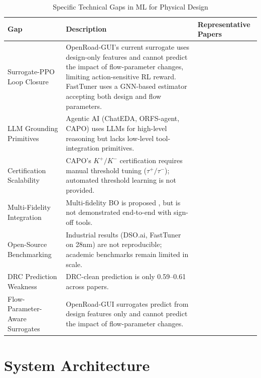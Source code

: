 \documentclass[10pt,conference]{IEEEtran}
\newcommand{\AUC}{\text{AUC}}
\begin{document}
\begin{table}[t]
\centering
\caption{Specific Technical Gaps in ML for Physical Design}
\label{tab:gaps}
\small
\setlength{\tabcolsep}{2.5pt}
\renewcommand{\arraystretch}{1.12}
\begin{tabularx}{\columnwidth}{@{}>{\raggedright\arraybackslash}p{}X>{\raggedright\arraybackslash}p{}@{}}
\toprule
Gap & Description & Representative Papers \\
\midrule
Surrogate-PPO Loop Closure & OpenRoad-GUI's current surrogate uses design-only features and cannot predict the impact of flow-parameter changes, limiting action-sensitive RL reward. FastTuner \cite{hsiao2026fasttuner} uses a GNN-based estimator accepting both design and flow parameters. & \cite{hsiao2026fasttuner, this work} \\
LLM Grounding Primitives & Agentic AI (ChatEDA, ORFS-agent, CAPO) uses LLMs for high-level reasoning but lacks low-level tool-integration primitives. & \cite{ghose2026agentic,jiang2026capo} \\
Certification Scalability & CAPO's $K^+/K^-$ certification requires manual threshold tuning ($\tau^+/\tau^-$); automated threshold learning is not provided. & \cite{jiang2026capo} \\
Multi-Fidelity Integration & Multi-fidelity BO is proposed \cite{chen2025graph,shrirao2024intelligent}, but is not demonstrated end-to-end with sign-off tools. & \cite{chen2025graph,shrirao2024intelligent} \\
Open-Source Benchmarking & Industrial results (DSO.ai, FastTuner on 28nm) are not reproducible; academic benchmarks remain limited in scale. & \cite{verma2024dso,hsiao2026fasttuner} \\
DRC Prediction Weakness & DRC-clean prediction \AUC{} is only 0.59--0.61 across papers. & \cite{mutar2026auto, this work} \\
Flow-Parameter-Aware Surrogates & OpenRoad-GUI surrogates predict from design features only and cannot predict the impact of flow-parameter changes. & \cite{this work} \\
\bottomrule
\end{tabularx}
\end{table}


\section{System Architecture}
\label{sec:architecture}
\end{document}
